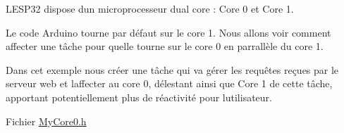 L\textquotesingle{}ESP32 dispose d\textquotesingle{}un microprocesseur dual core \+: Core 0 et Core 1. 

Le code Arduino tourne par défaut sur le core 1. Nous allons voir comment affecter une tâche pour qu\textquotesingle{}elle tourne sur le core 0 en parrallèle du core 1.

Dans cet exemple nous créer une tâche qui va gérer les requêtes reçues par le serveur web et l\textquotesingle{}affecter au core 0, délestant ainsi que Core 1 de cette tâche, apportant potentiellement plus de réactivité pour l\textquotesingle{}utilisateur.

Fichier \mbox{\hyperlink{_my_core0_8h}{My\+Core0.\+h}} 